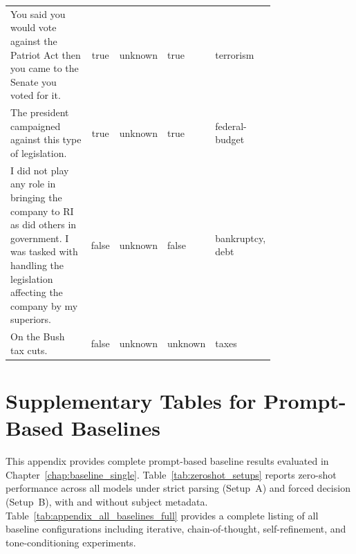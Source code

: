 \begin{table}[h]
\begin{tabular}{p{0.44\linewidth} c c p{0.1\linewidth} p{0.22\linewidth}}
You said you would vote against the Patriot Act then you came to the Senate you voted for it. &
true & unknown & true & terrorism \\
The president campaigned against this type of legislation. &
true & unknown & true & federal-budget \\
I did not play any role in bringing the company to RI as did others in government. I was tasked with handling the legislation affecting the company by my superiors. &
false & unknown & false & bankruptcy, debt \\
On the Bush tax cuts. &
false & unknown & unknown & taxes \\
\bottomrule
\end{tabular}
\end{table}


\chapter{Supplementary Tables for Prompt-Based Baselines}

This appendix provides complete prompt-based baseline results evaluated in Chapter~\ref{chap:baseline_single}. Table~\ref{tab:zeroshot_setups} reports zero-shot performance across all models under strict parsing (Setup~A) and forced decision (Setup~B), with and without subject metadata. Table~\ref{tab:appendix_all_baselines_full} provides a 
complete listing of all baseline configurations including iterative, chain-of-thought, self-refinement, and tone-conditioning experiments.

